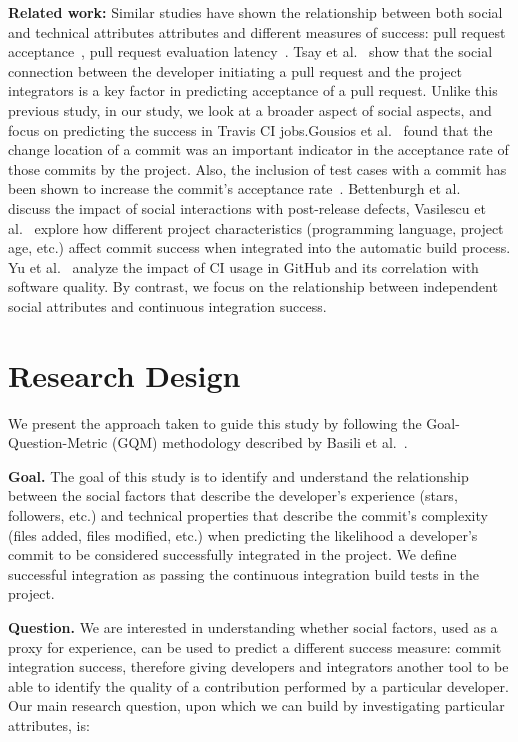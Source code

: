 \documentclass[10pt, conference]{IEEEtran}
\begin{document}
\vspace{1ex}
\noindent\textbf{Related work:}
Similar studies have shown the relationship between both social and technical attributes attributes and 
different measures of success: pull request acceptance~\cite{gousios14, 
gousios15,tsay14icse,tsay14fse}, pull request evaluation latency~\cite{Yu15}.
Tsay et al.~\cite{tsay14icse} 
show that the social connection between the developer initiating a
pull request and the project integrators is a key factor in predicting 
acceptance of a pull 
request. Unlike this previous study, in our study, we look at a broader aspect of 
social aspects, and focus on predicting the success in Travis
CI jobs.Gousios et al.~\cite{gousios14} found that the change location of a commit was
an important indicator in the acceptance rate of those commits by the project.
Also, the inclusion of test cases with a commit has been shown to increase the
commit's acceptance rate~\cite{gousios15}.
Bettenburgh et 
al.~\cite{bettenburgh10} discuss the impact of social interactions with 
post-release defects, Vasilescu et al.~\cite{vasilescu14} explore how different 
project characteristics (programming language, project age, etc.) affect commit 
success when integrated into the automatic build process. Yu et al.~\cite{yu16} 
analyze the impact of CI usage in GitHub and its correlation with software 
quality. By contrast, we focus on the relationship between independent social 
attributes and continuous integration success. 

\section{Research Design}

We present the approach taken to guide this study by
following the Goal-Question-Metric (GQM) methodology described by Basili et 
al.~\cite{Basili84}.

\vspace{1ex}
\noindent\textbf{Goal.}
The goal of this study is to identify and understand the relationship 
between the social factors that describe the
developer's experience (stars, followers, etc.) and technical properties that
describe the commit's complexity
(files added, files modified, etc.)
when predicting the likelihood a developer's commit
to be considered successfully integrated in the project. We define successful
integration as passing the continuous integration build tests in the project.

\vspace{1ex}
\noindent\textbf{Question.}
We are interested in understanding whether
social factors, used as a proxy for experience, can be used to predict
a different success measure: commit integration success, therefore giving
developers and integrators another tool to be able to identify the quality
of a contribution performed by a particular developer.
%
Our main research question, upon which we can build by investigating particular attributes, is:
\end{document}
